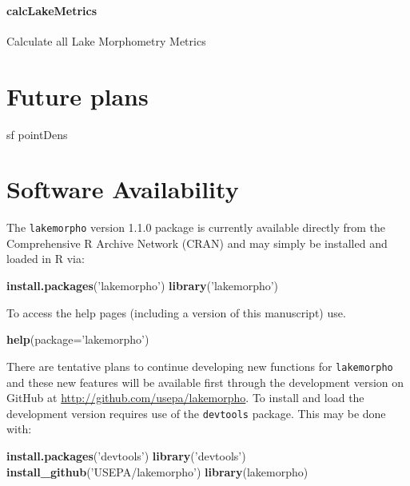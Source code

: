 \documentclass[11pt,]{article}
\newenvironment{Shaded}{\begin{snugshade}}{\end{snugshade}}
\newcommand{\KeywordTok}[1]{\textcolor[rgb]{0.13,0.29,0.53}{\textbf{{#1}}}}
\newcommand{\DataTypeTok}[1]{\textcolor[rgb]{0.13,0.29,0.53}{{#1}}}
\newcommand{\StringTok}[1]{\textcolor[rgb]{0.31,0.60,0.02}{{#1}}}
\newcommand{\NormalTok}[1]{{#1}}
\begin{document}
\paragraph{calcLakeMetrics}\label{calclakemetrics}

Calculate all Lake Morphometry Metrics

\section{Future plans}\label{future-plans}

sf pointDens

\section{Software Availability}\label{software-availability}

The \texttt{lakemorpho} version 1.1.0 package is currently available
directly from the Comprehensive R Archive Network (CRAN) and may simply
be installed and loaded in R via:

\begin{Shaded}
\begin{Highlighting}[]
\KeywordTok{install.packages}\NormalTok{(}\StringTok{'lakemorpho'}\NormalTok{)}
\KeywordTok{library}\NormalTok{(}\StringTok{'lakemorpho'}\NormalTok{)}
\end{Highlighting}
\end{Shaded}

To access the help pages (including a version of this manuscript) use.

\begin{Shaded}
\begin{Highlighting}[]
\KeywordTok{help}\NormalTok{(}\DataTypeTok{package=}\StringTok{'lakemorpho'}\NormalTok{)}
\end{Highlighting}
\end{Shaded}

There are tentative plans to continue developing new functions for
\texttt{lakemorpho} and these new features will be available first
through the development version on GitHub at
\href{http://github.com/USEPA/lakemorpho}{http://github.com/usepa/lakemorpho}.
To install and load the development version requires use of the
\texttt{devtools} package. This may be done with:

\begin{Shaded}
\begin{Highlighting}[]
\KeywordTok{install.packages}\NormalTok{(}\StringTok{'devtools'}\NormalTok{)}
\KeywordTok{library}\NormalTok{(}\StringTok{'devtools'}\NormalTok{)}
\KeywordTok{install_github}\NormalTok{(}\StringTok{'USEPA/lakemorpho'}\NormalTok{)}
\KeywordTok{library}\NormalTok{(lakemorpho)}
\end{Highlighting}
\end{Shaded}
\end{document}

